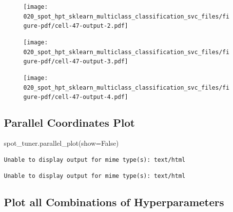 \documentclass[
  letterpaper,
  DIV=11,
  numbers=noendperiod]{scrreprt}
\newenvironment{Shaded}{\begin{snugshade}}{\end{snugshade}}
\newcommand{\NormalTok}[1]{\textcolor[rgb]{0.00,0.23,0.31}{#1}}
\newcommand{\OperatorTok}[1]{\textcolor[rgb]{0.37,0.37,0.37}{#1}}
\newcommand{\VariableTok}[1]{\textcolor[rgb]{0.07,0.07,0.07}{#1}}
\begin{document}
\begin{figure}[H]

{\centering \texttt{[image: 020\_spot\_hpt\_sklearn\_multiclass\_classification\_svc\_files/figure-pdf/cell-47-output-2.pdf]}

}

\end{figure}

\begin{figure}[H]

{\centering \texttt{[image: 020\_spot\_hpt\_sklearn\_multiclass\_classification\_svc\_files/figure-pdf/cell-47-output-3.pdf]}

}

\end{figure}

\begin{figure}[H]

{\centering \texttt{[image: 020\_spot\_hpt\_sklearn\_multiclass\_classification\_svc\_files/figure-pdf/cell-47-output-4.pdf]}

}

\end{figure}

\hypertarget{parallel-coordinates-plot-3}{%
\subsection{Parallel Coordinates
Plot}\label{parallel-coordinates-plot-3}}

\begin{Shaded}
\begin{Highlighting}[]
\NormalTok{spot\_tuner.parallel\_plot(show}\OperatorTok{=}\VariableTok{False}\NormalTok{)}
\end{Highlighting}
\end{Shaded}

\begin{verbatim}
Unable to display output for mime type(s): text/html
\end{verbatim}

\begin{verbatim}
Unable to display output for mime type(s): text/html
\end{verbatim}

\hypertarget{plot-all-combinations-of-hyperparameters-3}{%
\subsection{Plot all Combinations of
Hyperparameters}\label{plot-all-combinations-of-hyperparameters-3}}
\end{document}
